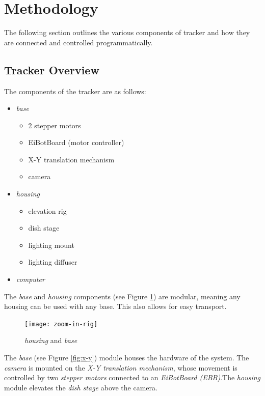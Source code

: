 \documentclass[main.tex]{subfiles}
\begin{document}
\graphicspath{{img/}{../img/}}




\section{Methodology}
The following section outlines the various components of tracker and how they are connected and controlled programmatically. 
\subsection{Tracker Overview}
The components of the tracker are as follows:
\begin{itemize}
\item \textit{base}
  \begin{itemize}
  \item 2 stepper motors
  \item EiBotBoard (motor controller)
  \item X-Y translation mechanism 
  \item camera
  \end{itemize}

\item \textit{housing}
  \begin{itemize}
  \item elevation rig
  \item dish stage
  \item lighting mount
  \item lighting diffuser
  \end{itemize}

\item \textit{computer}
\end{itemize}


The \textit{base} and \textit{housing} components (see Figure \ref{fig:rig}) are modular, meaning any housing can be used with any base. This also allows for easy transport. \\

\begin{figure}[!htbp]
  \centering
  \texttt{[image: zoom-in-rig]}
  \caption{\textit{housing} and \textit{base}}
  \label{fig:rig}
\end{figure}


The \textit{base} (see Figure \ref{fig:x-y}) module houses the hardware of the system. The \textit{camera} is mounted on the \textit{X-Y translation mechanism}, whose movement is controlled by two \textit{stepper motors} connected to an \textit{EiBotBoard (EBB)}.The \textit{housing} module elevates the \textit{dish stage} above the camera. 
\end{document}
